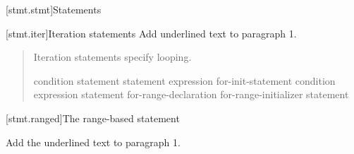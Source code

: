 
[stmt.stmt]{Statements}%

\setcounter{section}{4}
[stmt.iter]{Iteration statements}%
Add underlined text to paragraph 1.

\begin{quote}
\pnum
Iteration statements specify looping.

%
%
%
%
\begin{bnf}
	\br
	 condition \terminal{)} statement\br
	 statement  expression \terminal{) ;}\br
	 for-init-statement condition\opt \terminal{;} expression\opt \terminal{)} statement\br
	  
    \terminal{(} for-range-declaration \terminal{:} for-range-initializer \terminal{)} statement\br
\end{bnf}
\end{quote}


\setcounter{subsection}{3}
[stmt.ranged]{The range-based  statement}%

Add the underlined text to paragraph 1.

